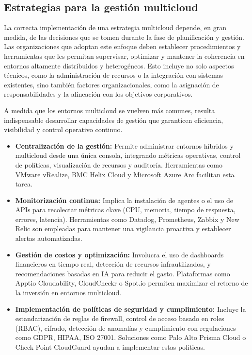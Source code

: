 {        \subsection{Estrategias para la gestión multicloud}
            La correcta implementación de una estrategia multicloud depende, en gran medida, de las decisiones que se tomen durante la fase de planificación y gestión. Las organizaciones que adoptan este enfoque deben establecer procedimientos y herramientas que les permitan supervisar, optimizar y mantener la coherencia en entornos altamente distribuidos y heterogéneos. Esto incluye no solo aspectos técnicos, como la administración de recursos o la integración con sistemas existentes, sino también factores organizacionales, como la asignación de responsabilidades y la alineación con los objetivos corporativos.
            
            A medida que los entornos multicloud se vuelven más comunes, resulta indispensable desarrollar capacidades de gestión que garanticen eficiencia, visibilidad y control operativo continuo.

            \begin{itemize}
                \item \textbf{Centralización de la gestión:} Permite administrar entornos híbridos y multicloud desde una única consola, integrando métricas operativas, control de políticas, visualización de recursos y auditoría. Herramientas como VMware vRealize, BMC Helix Cloud y Microsoft Azure Arc facilitan esta tarea.
                
                \item \textbf{Monitorización continua:} Implica la instalación de agentes o el uso de APIs para recolectar métricas clave (CPU, memoria, tiempo de respuesta, errores, latencia). Herramientas como Datadog, Prometheus, Zabbix y New Relic son empleadas para mantener una vigilancia proactiva y establecer alertas automatizadas.
                
                \item \textbf{Gestión de costos y optimización:} Involucra el uso de dashboards financieros en tiempo real, detección de recursos infrautilizados, y recomendaciones basadas en IA para reducir el gasto. Plataformas como Apptio Cloudability, CloudCheckr o Spot.io permiten maximizar el retorno de la inversión en entornos multicloud.
                
                \item \textbf{Implementación de políticas de seguridad y cumplimiento:} Incluye la estandarización de reglas de firewall, control de acceso basado en roles (RBAC), cifrado, detección de anomalías y cumplimiento con regulaciones como GDPR, HIPAA, ISO 27001. Soluciones como Palo Alto Prisma Cloud o Check Point CloudGuard ayudan a implementar estas políticas.
                

\end{itemize}}
